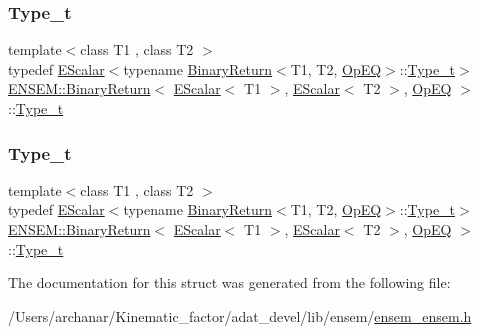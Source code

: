 \subsubsection{\texorpdfstring{Type\_t}{Type\_t}\hspace{0.1cm}{\footnotesize\ttfamily [1/2]}}
{\footnotesize\ttfamily template$<$class T1 , class T2 $>$ \\
typedef \mbox{\hyperlink{classENSEM_1_1EScalar}{E\+Scalar}}$<$typename \mbox{\hyperlink{structENSEM_1_1BinaryReturn}{Binary\+Return}}$<$T1, T2, \mbox{\hyperlink{structENSEM_1_1OpEQ}{Op\+EQ}}$>$\+::\mbox{\hyperlink{structENSEM_1_1BinaryReturn_3_01EScalar_3_01T1_01_4_00_01EScalar_3_01T2_01_4_00_01OpEQ_01_4_aa48d91b27d47338f959b3a78b8c2ed42}{Type\+\_\+t}}$>$ \mbox{\hyperlink{structENSEM_1_1BinaryReturn}{E\+N\+S\+E\+M\+::\+Binary\+Return}}$<$ \mbox{\hyperlink{classENSEM_1_1EScalar}{E\+Scalar}}$<$ T1 $>$, \mbox{\hyperlink{classENSEM_1_1EScalar}{E\+Scalar}}$<$ T2 $>$, \mbox{\hyperlink{structENSEM_1_1OpEQ}{Op\+EQ}} $>$\+::\mbox{\hyperlink{structENSEM_1_1BinaryReturn_3_01EScalar_3_01T1_01_4_00_01EScalar_3_01T2_01_4_00_01OpEQ_01_4_aa48d91b27d47338f959b3a78b8c2ed42}{Type\+\_\+t}}}

\mbox{\label{structENSEM_1_1BinaryReturn_3_01EScalar_3_01T1_01_4_00_01EScalar_3_01T2_01_4_00_01OpEQ_01_4_aa48d91b27d47338f959b3a78b8c2ed42}} 
\subsubsection{\texorpdfstring{Type\_t}{Type\_t}\hspace{0.1cm}{\footnotesize\ttfamily [2/2]}}
{\footnotesize\ttfamily template$<$class T1 , class T2 $>$ \\
typedef \mbox{\hyperlink{classENSEM_1_1EScalar}{E\+Scalar}}$<$typename \mbox{\hyperlink{structENSEM_1_1BinaryReturn}{Binary\+Return}}$<$T1, T2, \mbox{\hyperlink{structENSEM_1_1OpEQ}{Op\+EQ}}$>$\+::\mbox{\hyperlink{structENSEM_1_1BinaryReturn_3_01EScalar_3_01T1_01_4_00_01EScalar_3_01T2_01_4_00_01OpEQ_01_4_aa48d91b27d47338f959b3a78b8c2ed42}{Type\+\_\+t}}$>$ \mbox{\hyperlink{structENSEM_1_1BinaryReturn}{E\+N\+S\+E\+M\+::\+Binary\+Return}}$<$ \mbox{\hyperlink{classENSEM_1_1EScalar}{E\+Scalar}}$<$ T1 $>$, \mbox{\hyperlink{classENSEM_1_1EScalar}{E\+Scalar}}$<$ T2 $>$, \mbox{\hyperlink{structENSEM_1_1OpEQ}{Op\+EQ}} $>$\+::\mbox{\hyperlink{structENSEM_1_1BinaryReturn_3_01EScalar_3_01T1_01_4_00_01EScalar_3_01T2_01_4_00_01OpEQ_01_4_aa48d91b27d47338f959b3a78b8c2ed42}{Type\+\_\+t}}}



The documentation for this struct was generated from the following file\+:\begin{DoxyCompactItemize}
\item 
/\+Users/archanar/\+Kinematic\+\_\+factor/adat\+\_\+devel/lib/ensem/\mbox{\hyperlink{lib_2ensem_2ensem__ensem_8h}{ensem\+\_\+ensem.\+h}}\end{DoxyCompactItemize}
